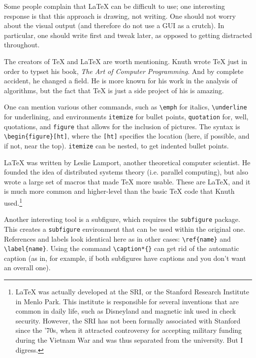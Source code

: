 Some people complain that \LaTeX{} can be difficult to use; one interesting response is that this approach is drawing, not writing. One should not worry about the visual output (and therefore do not use a GUI as a crutch). In particular, one should write first and tweak later, as opposed to getting distracted throughout.

The creators of \TeX{} and \LaTeX{} are worth mentioning. Knuth wrote \TeX{} just in order to typset his book, \emph{The Art of Computer Programming}. And by complete accident, he changed a field. He is more known for his work in the analysis of algorithms, but the fact that \TeX{} is just a side project of his is amazing.

One can mention various other commands, such as \verb+\emph+ for italics, \verb+\underline+ for underlining, and environments \texttt{itemize} for bullet points, \texttt{quotation} for, well, quotations, and \texttt{figure} that allows for the inclusion of pictures. The syntax is \verb+\begin{figure}[ht]+, where the \texttt{[ht]} specifies the location (here, if possible, and if not, near the top). \texttt{itemize} can be nested, to get indented bullet points.

\LaTeX{} was written by Leslie Lamport, another theoretical computer scientist. He founded the idea of distributed systems theory (i.e. parallel computing), but also wrote a large set of macros that made \TeX{} more usable. These are \LaTeX{}, and it is much more common and higher-level than the basic \TeX{} code that Knuth used.\footnote{\LaTeX{} was actually developed at the SRI, or the Stanford Research Institute in Menlo Park. This institute is responsible for several inventions that are common in daily life, such as Disneyland and magnetic ink used in check security. However, the SRI has not been formally associated with Stanford since the '70s, when it attracted controversy for accepting military funding during the Vietnam War and was thus separated from the university. But I digress.}

Another interesting tool is a subfigure, which requires the \texttt{subfigure} package. This creates a \texttt{subfigure} environment that can be used within the original one. References and labels look identical here as in other cases: \verb+\ref{name}+ and \verb+\label{name}+. Using the command \verb+\caption*{}+ can get rid of the automatic caption (as in, for example, if both subfigures have captions and you don't want an overall one).


